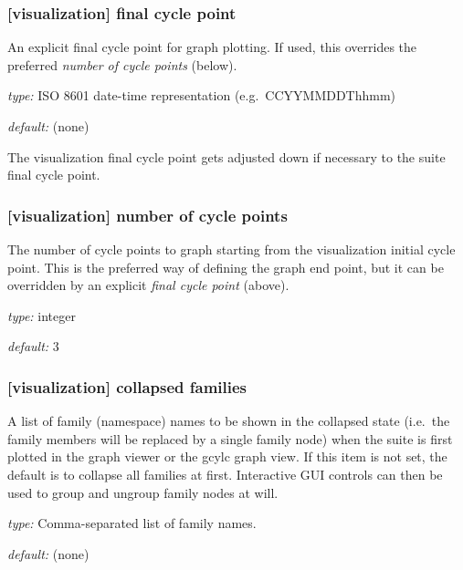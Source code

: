\subsubsection[final cycle point]{[visualization] \textrightarrow final cycle point}

An explicit final cycle point for graph plotting. If used, this overrides the
preferred {\em number of cycle points} (below).
\begin{myitemize}
    \item {\em type:} ISO 8601 date-time representation (e.g.\  CCYYMMDDThhmm)
    \item {\em default:} (none)
\end{myitemize}
The visualization final cycle point gets adjusted down if necessary to the
suite final cycle point.

\subsubsection[number of cycle points]{[visualization] \textrightarrow number of cycle points}

The number of cycle points to graph starting from the visualization initial
cycle point. This is the preferred way of defining the graph end point, but
it can be overridden by an explicit {\em final cycle point} (above).
\begin{myitemize}
    \item {\em type:} integer
    \item {\em default:} 3
\end{myitemize}

\subsubsection[collapsed families]{[visualization] \textrightarrow collapsed families}

A list of family (namespace) names to be shown in the collapsed state
(i.e.\ the family members will be replaced by a single family node) when
the suite is first plotted in the graph viewer or the gcylc graph view.
If this item is not set, the default is to collapse all families at first.
Interactive GUI controls can then be used to group and ungroup family
nodes at will.

\begin{myitemize}
    \item {\em type:} Comma-separated list of family names.
    \item {\em default:} (none)
\end{myitemize}

